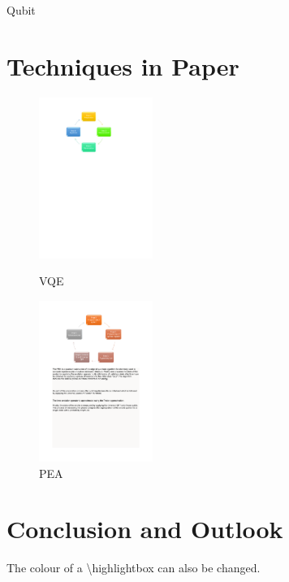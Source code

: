 \documentclass[landscape,color=UCLdarkred,margin=3cm]{uclposter}
\begin{document}
\begin{multicols}{3}
\begin{highlightbox}
	Qubit
\end{highlightbox}

\columnbreak

\section*{Techniques in Paper}



\begin{figure}[H]
  \begin{center}
  \begin{minipage}[c]{12em}
    
    \includegraphics[width=10em]{VQEdiagram.pdf}
    \caption{VQE}
  \end{minipage}
  \qquad
  \begin{minipage}[c]{12em}
    \centering
    \includegraphics[width=10em]{PEA.pdf}
    \caption{PEA}
  \end{minipage}
  \end{center}

   
\end{figure}



\columnbreak

\section*{Conclusion and Outlook}

\begin{highlightbox}
	The colour of a \textbackslash highlightbox can also be changed.
\end{highlightbox}



\end{multicols}
	
\end{document}
